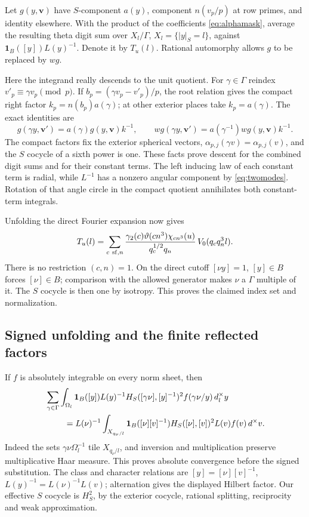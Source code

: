 \documentclass[11pt,a4paper]{article}
\numberwithin{equation}{section}
\theoremstyle{definition}
\theoremstyle{remark}
\newcommand{\ind}{\mathbf1}
\newcommand{\dd}{\,d}
\begin{document}
Let $g(y,\boldsymbol v)$ have $S$-component $a(y)$, component $n(v_p/p)$ at row primes, and identity elsewhere. With the product of the coefficients \eqref{eq:alphamask}, average the resulting theta digit sum over $X_l/\Gamma$, $X_l=\{|y|_S=l\}$, against $\ind_B([y])L(y)^{-1}$. Denote it by $T_u(l)$. Rational automorphy allows $g$ to be replaced by $wg$.

Here the integrand really descends to the unit quotient. For $\gamma\in\Gamma$ reindex $v'_p\equiv\gamma v_p\pmod p$. If $b_p=(\gamma v_p-v'_p)/p$, the root relation gives the compact right factor $k_p=n(b_p)a(\gamma)$; at other exterior places take $k_p=a(\gamma)$. The exact identities are
\[
 g(\gamma y,\boldsymbol v')=a(\gamma)g(y,\boldsymbol v)k^{-1},
 \qquad
 wg(\gamma y,\boldsymbol v')=a(\gamma^{-1})wg(y,\boldsymbol v)k^{-1}.
\]
The compact factors fix the exterior spherical vectors, $\alpha_{p,j}(\gamma v)=\alpha_{p,j}(v)$, and the $S$ cocycle of a sixth power is one. These facts prove descent for the combined digit sums and for their constant terms. The left inducing law of each constant term is radial, while $L^{-1}$ has a nonzero angular component by \eqref{eq:twomodes}. Rotation of that angle circle in the compact quotient annihilates both constant-term integrals.

Unfolding the direct Fourier expansion now gives
\begin{equation}\label{eq:Tdirect}
 T_u(l)=\sum_{c\ {\rm sf},n}
 \frac{\gamma_2(c)\vartheta(cn^3)\chi_{cn^3}(u)}
      {q_c^{1/2}q_n}\,V_0(q_cq_n^3l).
\end{equation}
There is no restriction $(c,n)=1$. On the direct cutoff $[\nu y]=1$, $[y]\in B$ forces $[\nu]\in B$; comparison with the allowed generator makes $\nu$ a $\Gamma$ multiple of it. The $S$ cocycle is then one by isotropy. This proves the claimed index set and normalization.

\subsection{Signed unfolding and the finite reflected factors}
If $f$ is absolutely integrable on every norm sheet, then
\begin{align}\label{eq:orbit}
 &\sum_{\gamma\in\Gamma}\int_{\Omega_l}\ind_B([y])L(y)^{-1}
 H_S([\gamma\nu],[y]^{-1})^2f(\gamma\nu/y)\dd_l^\times y \notag\\
 &\hspace{8mm}=L(\nu)^{-1}\int_{X_{q_\nu/l}}
 \ind_B([\nu][v]^{-1})H_S([\nu],[v])^2L(v)f(v)\dd^\times v .
\end{align}
Indeed the sets $\gamma\nu\Omega_l^{-1}$ tile $X_{q_\nu/l}$, and inversion and multiplication preserve multiplicative Haar measure. This proves absolute convergence before the signed substitution. The class and character relations are $[y]=[\nu][v]^{-1}$, $L(y)^{-1}=L(\nu)^{-1}L(v)$; alternation gives the displayed Hilbert factor. Our effective $S$ cocycle is $H_S^2$, by the exterior cocycle, rational splitting, reciprocity and weak approximation.
\end{document}
